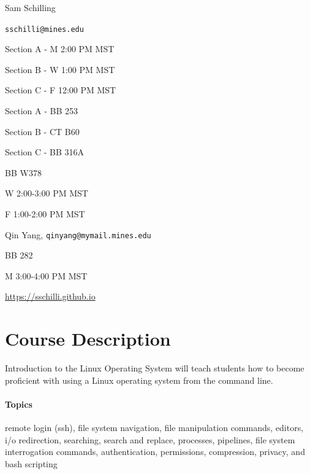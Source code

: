 \documentclass[12pt]{article}
\begin{document}
  \maketitle
\begin{description}
  \item[Instructor] Sam Schilling
  \item[Email] \texttt{sschilli@mines.edu}
  \item[Lecture Times]
  
  \item Section A - M 2:00  PM MST
  \item Section B - W 1:00  PM MST
  \item Section C - F 12:00 PM MST
  
  \item[Classrooms]
  
  \item Section A - BB 253
  \item Section B - CT B60
  \item Section C - BB 316A
  
  \item[Office Hours] BB W378 
  
  \item W 2:00-3:00 PM MST
  \item F 1:00-2:00 PM MST
  \item[TA] Qin Yang, \texttt{qinyang@mymail.mines.edu}
  \item[TA Office Hours] BB 282 
  \item M 3:00-4:00 PM MST
  \item[Course Webpage] \href{https://sschilli.github.io}{https://sschilli.github.io}
\end{description}
\section{Course Description}
Introduction to the Linux Operating System will teach students how to become proficient with using a Linux operating system from the command
line.

\paragraph{Topics} remote login (ssh), file system navigation, file manipulation commands, editors, i/o redirection, searching, search and replace,
processes, pipelines, file system interrogation commands, authentication, permissions, compression, privacy, and bash scripting
\end{document}
